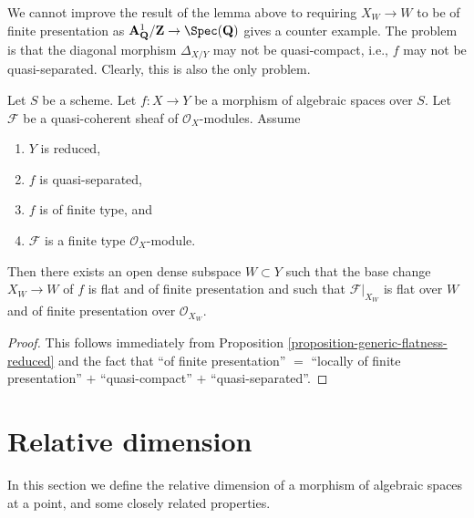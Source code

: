 \noindent
We cannot improve the result of the lemma above to requiring
$X_W \to W$ to be of finite presentation as
$\mathbf{A}^1_{\mathbf{Q}}/\mathbf{Z} \to \Spec(\mathbf{Q})$
gives a counter example. The problem is that the diagonal morphism
$\Delta_{X/Y}$ may not be quasi-compact, i.e., $f$ may not be
quasi-separated. Clearly, this is also the only problem.

\begin{proposition}
\label{proposition-generic-flatness-reduced-quasi-separated}
Let $S$ be a scheme.
Let $f : X \to Y$ be a morphism of algebraic spaces over $S$.
Let $\mathcal{F}$ be a quasi-coherent sheaf of $\mathcal{O}_X$-modules.
Assume
\begin{enumerate}
\item $Y$ is reduced,
\item $f$ is quasi-separated,
\item $f$ is of finite type, and
\item $\mathcal{F}$ is a finite type $\mathcal{O}_X$-module.
\end{enumerate}
Then there exists an open dense subspace $W \subset Y$ such that
the base change $X_W \to W$ of $f$ is flat and of finite presentation
and such that $\mathcal{F}|_{X_W}$ is flat over $W$ and of
finite presentation over $\mathcal{O}_{X_W}$.
\end{proposition}

\begin{proof}
This follows immediately from
Proposition \ref{proposition-generic-flatness-reduced}
and the fact that ``of finite presentation'' $=$
``locally of finite presentation'' $+$ ``quasi-compact'' $+$
``quasi-separated''.
\end{proof}















\section{Relative dimension}
\label{section-relative-dimension}

\noindent
In this section we define the relative dimension
of a morphism of algebraic spaces at a point, and some closely
related properties.

